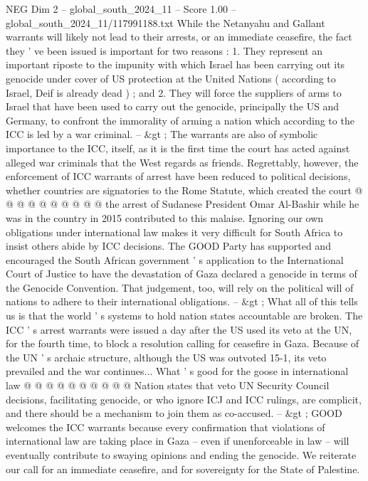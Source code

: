 \begin{textsample}{NEG Dim 2 – global\_south\_2024\_11 – Score 1.00 – global\_south\_2024\_11/117991188.txt}  \label{ex:f2_neg_266}
While the Netanyahu and Gallant warrants will likely not lead to their arrests, or an immediate ceasefire, the fact they ' ve been issued is important for two reasons : 1.
They represent an important riposte to the impunity with which Israel has been carrying out its genocide under cover of US protection at the United Nations ( according to Israel, Deif is already dead ) ; and 2.
They will force the suppliers of arms to Israel that have been used to carry out the genocide, principally the US and Germany, to confront the immorality of arming a nation which according to the ICC is led by a war criminal. -- \&gt ; The warrants are also of symbolic importance to the ICC, itself, as it is the first time the court has acted against alleged war criminals that the West regards as friends.
Regrettably, however, the enforcement of ICC warrants of arrest have been reduced to political decisions, whether countries are signatories to the Rome Statute, which created the court @ @ @ @ @ @ @ @ @ @ the arrest of Sudanese President Omar Al-Bashir while he was in the country in 2015 contributed to this malaise.
Ignoring our own obligations under international law makes it very difficult for South Africa to insist others abide by ICC decisions.
The GOOD Party has supported and encouraged the South African government ' s application to the International Court of Justice to have the devastation of Gaza declared a genocide in terms of the Genocide Convention.
That judgement, too, will rely on the political will of nations to adhere to their international obligations. -- \&gt ; What all of this tells us is that the world ' s systems to hold nation states accountable are broken.
The ICC ' s arrest warrants were issued a day after the US used its veto at the UN, for the fourth time, to block a resolution calling for ceasefire in Gaza.
Because of the UN ' s archaic structure, although the US was outvoted 15-1, its veto prevailed and the war continues...
What ' s good for the goose in international law @ @ @ @ @ @ @ @ @ @ Nation states that veto UN Security Council decisions, facilitating genocide, or who ignore ICJ and ICC rulings, are complicit, and there should be a mechanism to join them as co-accused. -- \&gt ; GOOD welcomes the ICC warrants because every confirmation that violations of international law are taking place in Gaza -- even if unenforceable in law -- will eventually contribute to swaying opinions and ending the genocide.
We reiterate our call for an immediate ceasefire, and for sovereignty for the State of Palestine.

\end{textsample}
